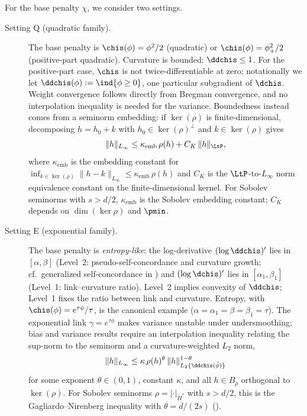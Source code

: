 \documentclass{article}
\begin{document}
For the base penalty $\chi$, we consider two settings.
\begin{description}
\item[Setting Q (quadratic family).]
The base penalty is $\chis(\phi) = \phi^2/2$ (quadratic)
or $\chis(\phi) = \phi_+^2/2$ (positive-part quadratic).
Curvature is bounded: $\ddchis \le 1$.
For the positive-part case, $\chis$ is not twice-differentiable at zero;
notationally we let $\ddchis(\phi) := \ind{\phi \ge 0}$,
one particular subgradient of $\dchis$.
Weight convergence follows directly from Bregman convergence,
and no interpolation inequality is needed for the variance.
Boundedness instead comes from a seminorm embedding:
if $\ker(\rho)$ is finite-dimensional,
decomposing $h = h_0 + k$
with $h_0 \in \ker(\rho)^\perp$ and $k \in \ker(\rho)$ gives
\begin{equation}\label{eq:seminorm-embedding}
\|h\|_{L_\infty}
  \le \kappa_{\mathrm{emb}}\, \rho(h) + C_K\, \|h\|_{\LtP},
\end{equation}
where $\kappa_{\mathrm{emb}}$ is the embedding constant
for $\inf_{k \in \ker(\rho)} \|h - k\|_{L_\infty}
  \le \kappa_{\mathrm{emb}}\, \rho(h)$
and $C_K$ is the $\LtP$-to-$L_\infty$
norm equivalence constant
on the finite-dimensional kernel.
For Sobolev seminorms with $s > d/2$,
$\kappa_{\mathrm{emb}}$ is the Sobolev embedding constant;
$C_K$ depends on $\dim(\ker\rho)$ and $\pmin$.
\item[Setting E (exponential family).]
The base penalty is \emph{entropy-like}:
the log-derivative $(\log \ddchis)'$ lies in $[\alpha, \beta]$
(Level~2: pseudo-self-concordance and curvature growth;
cf.\ generalized self-concordance in \citet{bach2010self})
and $(\log \dchis)'$ lies in $[\alpha_1, \beta_1]$
(Level~1: link--curvature ratio).
Level~2 implies convexity of $\ddchis$;
Level~1 fixes the ratio between link and curvature.
Entropy, with $\chis(\phi) = e^{\tau\phi}/\tau$,
is the canonical example
($\alpha = \alpha_1 = \beta = \beta_1 = \tau$).
The exponential link $\gamma = e^{\tau\phi}$
makes variance unstable under undersmoothing;
bias and variance results
require an interpolation inequality
relating the sup-norm to the seminorm
and a curvature-weighted $L_2$ norm,
\begin{equation}
\label{eq:interpolation}
\|h\|_{L_\infty} \le \kappa\, \rho(h)^\theta\, \|h\|_{L_2\{\ddchis(\tilde\phi)\}}^{1-\theta}
\end{equation}
for some exponent $\theta \in (0,1)$,
constant $\kappa$,
and all $h \in B_\rho$ orthogonal to $\ker(\rho)$.
For Sobolev seminorms
$\rho = |\cdot|_{\dot H^s}$ with $s > d/2$,
this is the Gagliardo--Nirenberg inequality
with $\theta = d/(2s)$
().
\end{description}
\end{document}
